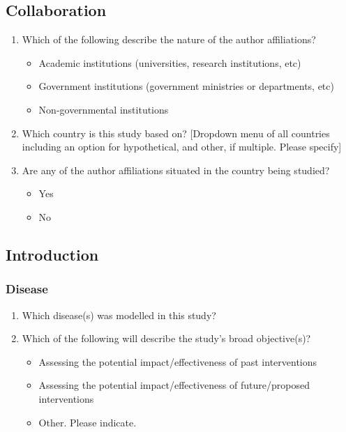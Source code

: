 \documentclass[10pt,a4paper]{article}
\begin{document}
	\subsection{Collaboration }
	\begin{enumerate}[resume]
		\item Which of the following describe the nature of the author affiliations? 
		\begin{itemize}
			\item Academic institutions (universities, research institutions, etc)
			\item Government institutions (government ministries or departments, etc)
			\item Non-governmental institutions 
		\end{itemize}
		\item Which country is this study based on? [Dropdown menu of all countries including an option for hypothetical, and other, if multiple. Please specify]
		\item Are any of the author affiliations situated in the country being studied? 
		\begin{itemize}
			\item Yes 
			\item No
		\end{itemize}
	\end{enumerate}
	
	\subsection{Introduction}
	\subsubsection{Disease}
	\begin{enumerate}[resume]
		\item Which disease(s) was modelled in this study?
		\item Which of the following will describe the study’s broad objective(s)? 
		\begin{itemize}
			\item Assessing the potential impact/effectiveness of past interventions
			\item Assessing the potential impact/effectiveness of future/proposed interventions
			\item Other. Please indicate.
		\end{itemize}
	\end{enumerate}
	
\end{document}

